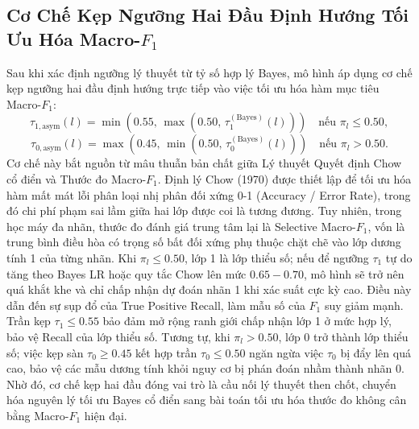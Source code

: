 \documentclass[10pt,a4paper,twoside]{article}
\begin{document}
\subsection{Cơ Chế Kẹp Ngưỡng Hai Đầu Định Hướng Tối Ưu Hóa Macro-\texorpdfstring{$F_1$}{F1}}
Sau khi xác định ngưỡng lý thuyết từ tỷ số hợp lý Bayes, mô hình áp dụng cơ chế kẹp ngưỡng hai đầu định hướng trực tiếp vào việc tối ưu hóa hàm mục tiêu Macro-$F_1$:
\begin{equation}
\tau_{1,\text{asym}}(l) = \min\left(0.55, \, \max\left(0.50, \, \tau_1^{(\text{Bayes})}(l)\right)\right) \quad \text{nếu } \pi_l \le 0.50,
\end{equation}
\begin{equation}
\tau_{0,\text{asym}}(l) = \max\left(0.45, \, \min\left(0.50, \, \tau_0^{(\text{Bayes})}(l)\right)\right) \quad \text{nếu } \pi_l > 0.50.
\end{equation}
Cơ chế này bắt nguồn từ mâu thuẫn bản chất giữa Lý thuyết Quyết định Chow cổ điển và Thước đo Macro-$F_1$. Định lý Chow (1970) được thiết lập để tối ưu hóa hàm mất mát lỗi phân loại nhị phân đối xứng 0-1 (Accuracy / Error Rate), trong đó chi phí phạm sai lầm giữa hai lớp được coi là tương đương. Tuy nhiên, trong học máy đa nhãn, thước đo đánh giá trung tâm lại là Selective Macro-$F_1$, vốn là trung bình điều hòa có trọng số bất đối xứng phụ thuộc chặt chẽ vào lớp dương tính 1 của từng nhãn. Khi $\pi_l \le 0.50$, lớp 1 là lớp thiểu số; nếu để ngưỡng $\tau_1$ tự do tăng theo Bayes LR hoặc quy tắc Chow lên mức $0.65 - 0.70$, mô hình sẽ trở nên quá khắt khe và chỉ chấp nhận dự đoán nhãn 1 khi xác suất cực kỳ cao. Điều này dẫn đến sự sụp đổ của True Positive Recall, làm mẫu số của $F_1$ suy giảm mạnh. Trần kẹp $\tau_1 \le 0.55$ bảo đảm mở rộng ranh giới chấp nhận lớp 1 ở mức hợp lý, bảo vệ Recall của lớp thiểu số. Tương tự, khi $\pi_l > 0.50$, lớp 0 trở thành lớp thiểu số; việc kẹp sàn $\tau_0 \ge 0.45$ kết hợp trần $\tau_0 \le 0.50$ ngăn ngừa việc $\tau_0$ bị đẩy lên quá cao, bảo vệ các mẫu dương tính khỏi nguy cơ bị phán đoán nhầm thành nhãn 0. Nhờ đó, cơ chế kẹp hai đầu đóng vai trò là cầu nối lý thuyết then chốt, chuyển hóa nguyên lý tối ưu Bayes cổ điển sang bài toán tối ưu hóa thước đo không cân bằng Macro-$F_1$ hiện đại.
\end{document}
